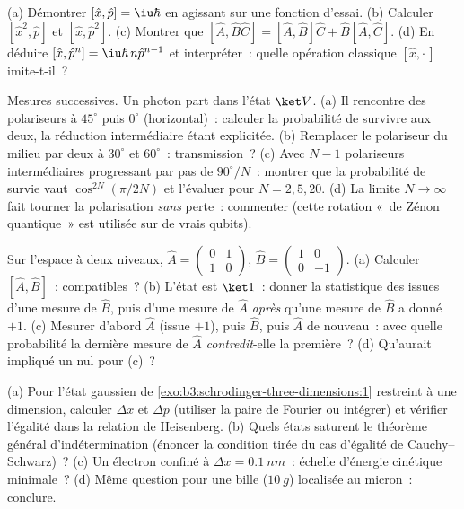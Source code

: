 \begin{exercise}[$\star$]\label{exo:b3:quantum-formalism:4}
(a) Démontrer $[\hat x, \hat p] = \iu\hbar$ en agissant sur une
fonction d'essai. (b) Calculer $[\hat x^2, \hat p]$ et $[\hat x, \hat p^2]$. (c) Montrer que
$[\hat A, \hat B\hat C] = [\hat A, \hat B]\hat C + \hat B[\hat A,
\hat C]$. (d) En déduire $[\hat x, \hat p^n] = \iu\hbar\,n\hat p^{n-1}$
et interpréter~: quelle opération classique $[\hat x, \cdot\,]$
imite-t-il~?
\end{exercise}

\begin{exercise}[$\star\star$]\label{exo:b3:quantum-formalism:5}
Mesures successives. Un photon part dans l'état $\ket V$. (a) Il
rencontre des polariseurs à $45^\circ$ puis $0^\circ$ (horizontal)~:
calculer la probabilité de survivre aux deux, la réduction
intermédiaire étant explicitée. (b) Remplacer le polariseur du milieu
par deux à $30^\circ$ et $60^\circ$~: transmission~? (c) Avec $N - 1$
polariseurs intermédiaires progressant par pas de $90^\circ/N$~:
montrer que la probabilité de survie vaut $\cos^{2N}(\pi/2N)$ et
l'évaluer pour $N = 2, 5, 20$. (d) La limite $N \to \infty$ fait
tourner la polarisation \emph{sans} perte~: commenter (cette rotation
«~de Zénon quantique~» est utilisée sur de vrais qubits).
\end{exercise}

\begin{exercise}[$\star\star$]\label{exo:b3:quantum-formalism:6}
Sur l'espace à deux niveaux, $\hat A = \begin{pmatrix}0&1\\1&0
\end{pmatrix}$, $\hat B = \begin{pmatrix}1&0\\0&-1\end{pmatrix}$.
(a) Calculer $[\hat A, \hat B]$~: compatibles~? (b) L'état est
$\ket1$~: donner la statistique des issues d'une mesure de $\hat B$,
puis d'une mesure de $\hat A$ \emph{après} qu'une mesure de $\hat B$ a
donné $+1$. (c) Mesurer d'abord $\hat A$ (issue $+1$), puis $\hat B$,
puis $\hat A$ de nouveau~: avec quelle probabilité la dernière mesure
de $\hat A$ \emph{contredit}-elle la première~? (d) Qu'aurait impliqué
un  nul pour (c)~?
\end{exercise}

\begin{exercise}[$\star\star$]\label{exo:b3:quantum-formalism:7}
(a) Pour l'état gaussien de
\cref{exo:b3:schrodinger-three-dimensions:1} restreint à une
dimension, calculer $\Delta x$ et $\Delta p$ (utiliser la paire de
Fourier ou intégrer) et vérifier l'égalité dans la relation de
Heisenberg. (b) Quels états saturent le théorème général
d'indétermination (énoncer la condition tirée du cas d'égalité de
Cauchy--Schwarz)~? (c) Un électron confiné à $\Delta x = \qty{0.1}{nm}$~:
échelle d'énergie cinétique minimale~? (d) Même question pour une bille
($\qty{10}{g}$) localisée au micron~: conclure.
\end{exercise}

